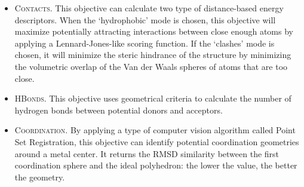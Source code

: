 \begin{itemize}
	\item \textsc{Contacts}. This objective can calculate two type of distance-based energy descriptors. When the ‘hydrophobic’ mode is chosen, this objective will maximize potentially attracting interactions between close enough atoms by applying a Lennard-Jones-like scoring function. If the ‘clashes’ mode is chosen, it will minimize the steric hindrance of the structure by minimizing the volumetric overlap of the Van der Waals spheres of atoms that are too close.

	\item \textsc{HBonds}. This objective uses geometrical criteria to calculate the number of hydrogen bonds between potential donors and acceptors.

	\item \textsc{Coordination}. By applying a type of computer vision algorithm called Point Set Registration, this objective can identify potential coordination geometries around a metal center. It returns the RMSD similarity between the first coordination sphere and the ideal polyhedron: the lower the value, the better the geometry.
\end{itemize}


